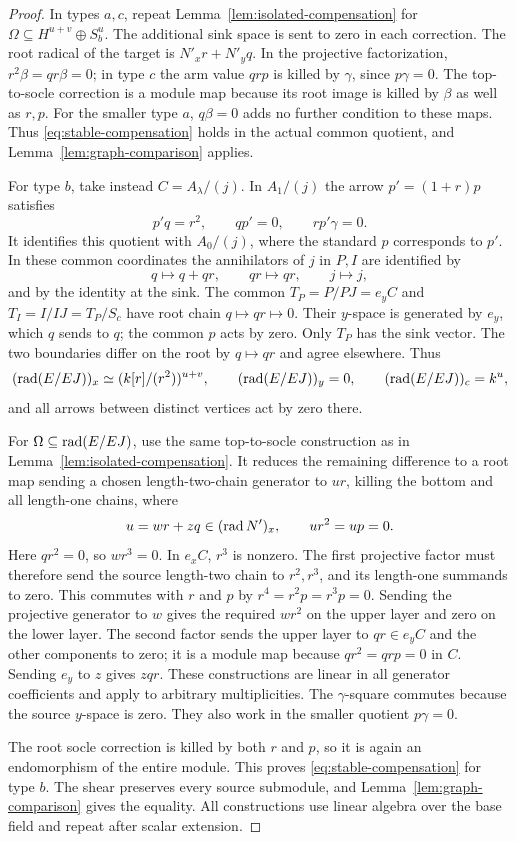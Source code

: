 \begin{proof}
In types $a,c$, repeat Lemma~\ref{lem:isolated-compensation} for $\Omega\subseteq H^{u+v}\oplus S_b^u$. The additional sink space is sent to zero in each correction. The root radical of the target is $N'_xr+N'_yq$. In the projective factorization, $r^2\beta=qr\beta=0$; in type $c$ the arm value $qrp$ is killed by $\gamma$, since $p\gamma=0$. The top-to-socle correction is a module map because its root image is killed by $\beta$ as well as $r,p$. For the smaller type $a$, $q\beta=0$ adds no further condition to these maps. Thus \eqref{eq:stable-compensation} holds in the actual common quotient, and Lemma~\ref{lem:graph-comparison} applies.

For type $b$, take instead $C=A_\lambda/(j)$. In $A_1/(j)$ the arrow $p'=(1+r)p$ satisfies
\[
 p'q=r^2,\qquad qp'=0,\qquad rp'\gamma=0.
\]
It identifies this quotient with $A_0/(j)$, where the standard $p$ corresponds to $p'$. In these common coordinates the annihilators of $j$ in $P,I$ are identified by
\[
 q\longmapsto q+qr,\qquad qr\longmapsto qr,\qquad j\longmapsto j,
\]
and by the identity at the sink. The common $T_P=P/PJ=e_yC$ and $T_I=I/IJ=T_P/S_c$ have root chain $q\mapsto qr\mapsto0$. Their $y$-space is generated by $e_y$, which $q$ sends to $q$; the common $p$ acts by zero. Only $T_P$ has the sink vector. The two boundaries differ on the root by $q\mapsto qr$ and agree elsewhere. Thus
\[
 (\operatorname{rad}(E/EJ))_x\simeq (k[r]/(r^2))^{u+v},\qquad
 (\operatorname{rad}(E/EJ))_y=0,\qquad (\operatorname{rad}(E/EJ))_c=k^u,
\]
and all arrows between distinct vertices act by zero there.

For $\Omega\subseteq\operatorname{rad}(E/EJ)$, use the same top-to-socle construction as in Lemma~\ref{lem:isolated-compensation}. It reduces the remaining difference to a root map sending a chosen length-two-chain generator to $ur$, killing the bottom and all length-one chains, where
\[
 u=wr+zq\in(\operatorname{rad} N')_x,\qquad ur^2=up=0.
\]
Here $qr^2=0$, so $wr^3=0$. In $e_xC$, $r^3$ is nonzero. The first projective factor must therefore send the source length-two chain to $r^2,r^3$, and its length-one summands to zero. This commutes with $r$ and $p$ by $r^4=r^2p=r^3p=0$. Sending the projective generator to $w$ gives the required $wr^2$ on the upper layer and zero on the lower layer. The second factor sends the upper layer to $qr\in e_yC$ and the other components to zero; it is a module map because $qr^2=qrp=0$ in $C$. Sending $e_y$ to $z$ gives $zqr$. These constructions are linear in all generator coefficients and apply to arbitrary multiplicities. The $\gamma$-square commutes because the source $y$-space is zero. They also work in the smaller quotient $p\gamma=0$.

The root socle correction is killed by both $r$ and $p$, so it is again an endomorphism of the entire module. This proves \eqref{eq:stable-compensation} for type $b$. The shear preserves every source submodule, and Lemma~\ref{lem:graph-comparison} gives the equality. All constructions use linear algebra over the base field and repeat after scalar extension.
\end{proof}

